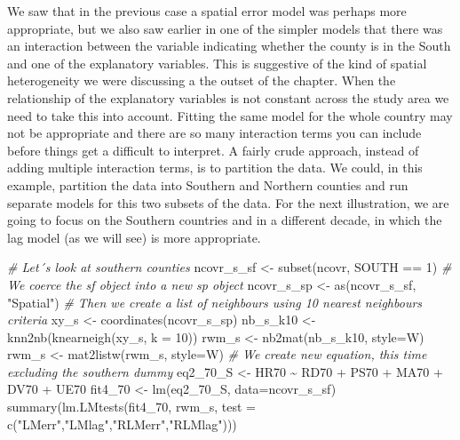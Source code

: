\documentclass[
  krantz2]{krantz}
\makeatletter
\newenvironment{Shaded}{\begin{snugshade}}{\end{snugshade}}
\newcommand{\AttributeTok}[1]{\textcolor[rgb]{0.61,0.61,0.61}{#1}}
\newcommand{\CommentTok}[1]{\textcolor[rgb]{0.37,0.37,0.37}{\textit{#1}}}
\newcommand{\DecValTok}[1]{\textcolor[rgb]{0.06,0.06,0.06}{#1}}
\newcommand{\FunctionTok}[1]{\textcolor[rgb]{0,0,0}{#1}}
\newcommand{\NormalTok}[1]{#1}
\newcommand{\OtherTok}[1]{\textcolor[rgb]{0.37,0.37,0.37}{#1}}
\newcommand{\SpecialCharTok}[1]{\textcolor[rgb]{0,0,0}{#1}}
\newcommand{\StringTok}[1]{\textcolor[rgb]{0.5,0.5,0.5}{#1}}
\newenvironment{kframe}{%
\medskip{}
\setlength{\fboxsep}{.8em}
 \def\at@end@of@kframe{}%
 \ifinner\ifhmode%
  \def\at@end@of@kframe{\end{minipage}}%
  \begin{minipage}{\columnwidth}%
 \fi\fi%
 \def\FrameCommand##1{\hskip\@totalleftmargin \hskip-\fboxsep
 \colorbox{shadecolor}{##1}\hskip-\fboxsep
     \hskip-\linewidth \hskip-\@totalleftmargin \hskip\columnwidth}%
 \MakeFramed {\advance\hsize-\width
   \@totalleftmargin\z@ \linewidth\hsize
   \@setminipage}}%
 {\par\unskip\endMakeFramed%
 \at@end@of@kframe}
\renewenvironment{Shaded}{\begin{kframe}}{\end{kframe}}
\makeatother
\begin{document}
We saw that in the previous case a spatial error model was perhaps more appropriate, but we also saw earlier in one of the simpler models that there was an interaction between the variable indicating whether the county is in the South and one of the explanatory variables. This is suggestive of the kind of spatial heterogeneity we were discussing a the outset of the chapter. When the relationship of the explanatory variables is not constant across the study area we need to take this into account. Fitting the same model for the whole country may not be appropriate and there are so many interaction terms you can include before things get a difficult to interpret. A fairly crude approach, instead of adding multiple interaction terms, is to partition the data. We could, in this example, partition the data into Southern and Northern counties and run separate models for this two subsets of the data. For the next illustration, we are going to focus on the Southern countries and in a different decade, in which the lag model (as we will see) is more appropriate.

\begin{Shaded}
\begin{Highlighting}[]
\CommentTok{\# Let´s look at southern counties}
\NormalTok{ncovr\_s\_sf }\OtherTok{\textless{}{-}} \FunctionTok{subset}\NormalTok{(ncovr, SOUTH }\SpecialCharTok{==} \DecValTok{1}\NormalTok{)}
\CommentTok{\# We coerce the sf object into a new sp object}
\NormalTok{ncovr\_s\_sp }\OtherTok{\textless{}{-}} \FunctionTok{as}\NormalTok{(ncovr\_s\_sf, }\StringTok{"Spatial"}\NormalTok{)}
\CommentTok{\# Then we create a list of neighbours using 10 nearest neighbours criteria}
\NormalTok{xy\_s }\OtherTok{\textless{}{-}} \FunctionTok{coordinates}\NormalTok{(ncovr\_s\_sp)}
\NormalTok{nb\_s\_k10 }\OtherTok{\textless{}{-}} \FunctionTok{knn2nb}\NormalTok{(}\FunctionTok{knearneigh}\NormalTok{(xy\_s, }\AttributeTok{k =} \DecValTok{10}\NormalTok{))}
\NormalTok{rwm\_s }\OtherTok{\textless{}{-}} \FunctionTok{nb2mat}\NormalTok{(nb\_s\_k10, }\AttributeTok{style=}\StringTok{\textquotesingle{}W\textquotesingle{}}\NormalTok{)}
\NormalTok{rwm\_s }\OtherTok{\textless{}{-}} \FunctionTok{mat2listw}\NormalTok{(rwm\_s, }\AttributeTok{style=}\StringTok{\textquotesingle{}W\textquotesingle{}}\NormalTok{)}
\CommentTok{\# We create new equation, this time excluding the southern dummy}
\NormalTok{eq2\_70\_S }\OtherTok{\textless{}{-}}\NormalTok{ HR70 }\SpecialCharTok{\textasciitilde{}}\NormalTok{ RD70 }\SpecialCharTok{+}\NormalTok{ PS70 }\SpecialCharTok{+}\NormalTok{ MA70 }\SpecialCharTok{+}\NormalTok{ DV70 }\SpecialCharTok{+}\NormalTok{ UE70}
\NormalTok{fit4\_70 }\OtherTok{\textless{}{-}} \FunctionTok{lm}\NormalTok{(eq2\_70\_S, }\AttributeTok{data=}\NormalTok{ncovr\_s\_sf)}
\FunctionTok{summary}\NormalTok{(}\FunctionTok{lm.LMtests}\NormalTok{(fit4\_70, rwm\_s, }\AttributeTok{test =} \FunctionTok{c}\NormalTok{(}\StringTok{"LMerr"}\NormalTok{,}\StringTok{"LMlag"}\NormalTok{,}\StringTok{"RLMerr"}\NormalTok{,}\StringTok{"RLMlag"}\NormalTok{)))}
\end{Highlighting}
\end{Shaded}
\end{document}
